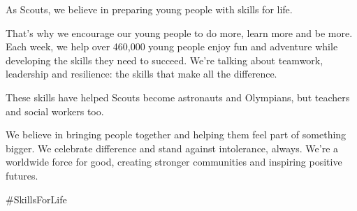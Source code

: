 \begin{frame}
\hspace*{1mm}
\begin{minipage}[t]{0.95\textwidth}
\raggedright
\vspace*{2mm}
\begin{multicols}{2}
\footnotesize %
\linespread{1.1}\selectfont
As Scouts, we believe in preparing
young people with skills for life. 
\par
\vspace{\baselineskip}
That’s why we encourage our young
people to do more, learn more and be
more. Each week, we help over
460,000 young people enjoy fun and
adventure while developing the skills
they need to succeed. We’re talking
about teamwork, leadership and
resilience: the skills that make all the
difference.
\par
\vspace{2\baselineskip}
These skills have helped Scouts
become astronauts and Olympians, but
teachers and social workers too.
\par
\vspace{\baselineskip}
We believe in bringing people together
and helping them feel part of
something bigger. We celebrate
difference and stand against
intolerance, always. We’re a worldwide
force for good, creating stronger
communities and inspiring positive
futures.
\par
\vspace{\baselineskip}
\alert{\#SkillsForLife}

\end{multicols}
\end{minipage}
\end{frame}

